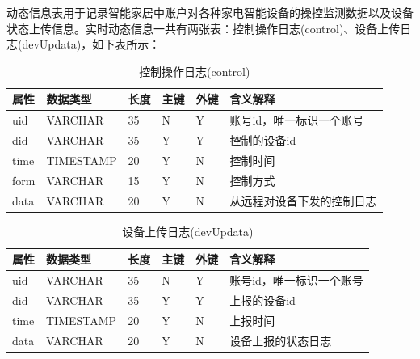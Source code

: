 \begin{CJK*}{UTF8}{song}
\begin{enumerate}
动态信息表用于记录智能家居中账户对各种家电智能设备的操控监测数据以及设备状态上传信息。实时动态信息一共有两张表：控制操作日志(control)、设备上传日志(devUpdata)，如下表所示：
    \begin{table}[H]
    \centering
    \caption{控制操作日志(control)}
    \vspace{2mm}
    \small
    \begin{tabular}{lllllp{2cm}}
    \toprule
        \textbf{属性} & \textbf{数据类型} & \textbf{长度} & \textbf{主键} & \textbf{外键} & \textbf{含义解释} \\
        \hline
        uid & VARCHAR & 35 & N & Y & 账号id，唯一标识一个账号 \\
        did & VARCHAR & 35 & Y & Y & 控制的设备id \\
        time & TIMESTAMP & 20 & Y & N & 控制时间 \\
        form & VARCHAR & 15 & Y & N & 控制方式 \\
        data & VARCHAR & 20 & Y & N & 从远程对设备下发的控制日志 \\
        \bottomrule
    \end{tabular}
    \label{tab1}
    \end{table}
    \begin{table}[H]
    \centering
    \caption{设备上传日志(devUpdata)}
    \vspace{2mm}
    \small
    \begin{tabular}{lllllp{2cm}}
    \toprule
        \textbf{属性} & \textbf{数据类型} & \textbf{长度} & \textbf{主键} & \textbf{外键} & \textbf{含义解释} \\
        \hline
        uid & VARCHAR & 35 & N & Y & 账号id，唯一标识一个账号 \\
        did & VARCHAR & 35 & Y & Y & 上报的设备id \\
        time & TIMESTAMP & 20 & Y & N & 上报时间 \\
        data & VARCHAR & 20 & Y & N & 设备上报的状态日志 \\
        \bottomrule
    \end{tabular}
    \label{tab1}
    \end{table}


\end{enumerate}
\end{CJK*}

